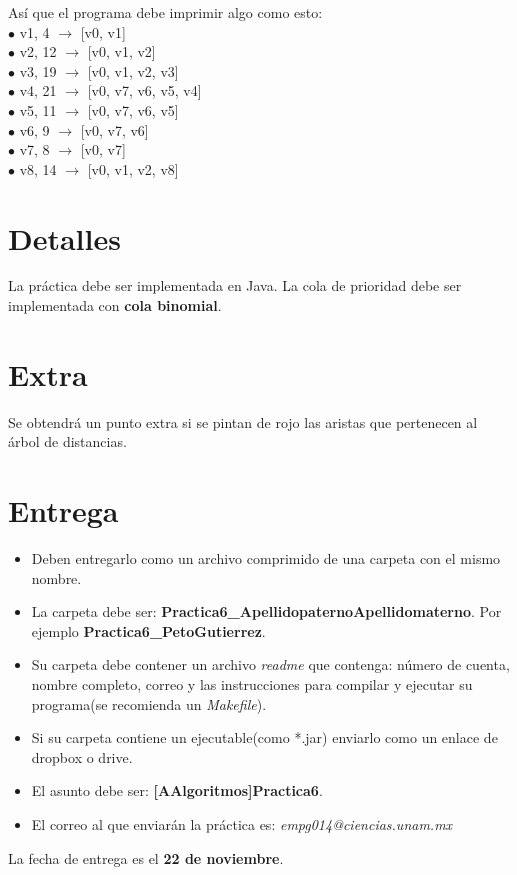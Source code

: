 \documentclass{article}
\begin{document}
Así que el programa debe imprimir algo como esto:\\
$\bullet$ v1, 4 $\rightarrow$ [v0, v1]\\
$\bullet$ v2, 12 $\rightarrow$ [v0, v1, v2]\\
$\bullet$ v3, 19 $\rightarrow$ [v0, v1, v2, v3]\\
$\bullet$ v4, 21 $\rightarrow$ [v0, v7, v6, v5, v4]\\
$\bullet$ v5, 11 $\rightarrow$ [v0, v7, v6, v5]\\
$\bullet$ v6, 9 $\rightarrow$ [v0, v7, v6]\\
$\bullet$ v7, 8 $\rightarrow$ [v0, v7]\\
$\bullet$ v8, 14 $\rightarrow$ [v0, v1, v2, v8]

\section{Detalles}

La práctica debe ser implementada en Java. La cola de prioridad debe ser implementada con {\bf cola binomial}.

\section{Extra}

Se obtendrá un punto extra si se pintan de rojo las aristas que pertenecen al árbol de distancias.

\section{Entrega}

\begin{itemize}
\item Deben entregarlo como un archivo comprimido de una carpeta con el mismo nombre.
\item La carpeta debe ser: \textbf{Practica6\_ApellidopaternoApellidomaterno}. Por ejemplo \textbf{Practica6\_PetoGutierrez}.
\item Su carpeta debe contener un archivo \emph{readme} que contenga: número de cuenta, nombre completo, 
correo y las instrucciones para compilar y ejecutar su programa(se recomienda un \emph{Makefile}).
\item Si su carpeta contiene un ejecutable(como *.jar) enviarlo como un enlace de dropbox o drive.
\item El asunto debe ser: \textbf{[AAlgoritmos]Practica6}.
\item El correo al que enviarán la práctica es: \emph{empg014@ciencias.unam.mx}
\end{itemize}

La fecha de entrega es el \textbf{22 de noviembre}.
\end{document}
